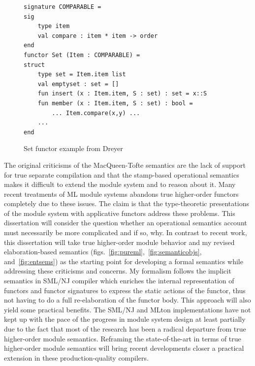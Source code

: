 \documentclass[12pt]{article}
\begin{document}
\begin{figure}
\begin{lstlisting}
signature COMPARABLE = 
sig 
	type item 
	val compare : item * item -> order 
end 
functor Set (Item : COMPARABLE) = 
struct 
	type set = Item.item list 
	val emptyset : set = [] 
	fun insert (x : Item.item, S : set) : set = x::S 
	fun member (x : Item.item, S : set) : bool = 
		... Item.compare(x,y) ... 
	... 
end 
\end{lstlisting}	
\caption{Set functor example from Dreyer\cite{dreyerthesis}}
\label{fig:setfct}
\end{figure}

The original criticisms of the MacQueen-Tofte semantics are the lack of support for true separate compilation and that the stamp-based operational semantics makes it difficult to extend the module system and to reason about it. Many recent treatments of ML module systems abandons true higher-order functors completely due to these issues. The claim is that the type-theoretic presentations of the module system with applicative functors address these problems. This dissertation will consider the question whether an operational semantics account must necessarily be more complicated and if so, why. In contrast to recent work, this dissertation will take true higher-order module behavior and my revised elaboration-based semantics (figs.~\ref{fig:pureml},~\ref{fig:semanticobjs}, and~\ref{fig:entsems}) as the starting point for developing a formal semantics while addressing these criticisms and concerns. My formalism follows the implicit semantics in SML/NJ compiler which enriches the internal representation of functors and functor signatures to express the static actions of the functor, thus not having to do a full re-elaboration of the functor body. This approach will also yield some practical benefits. The SML/NJ and MLton implementations have not kept up with the pace of the progress in module system design at least partially due to the fact that most of the research has been a radical departure from true higher-order module semantics. Reframing the state-of-the-art in terms of true higher-order module semantics will bring recent developments closer a practical extension in these production-quality compilers. 
\end{document}
